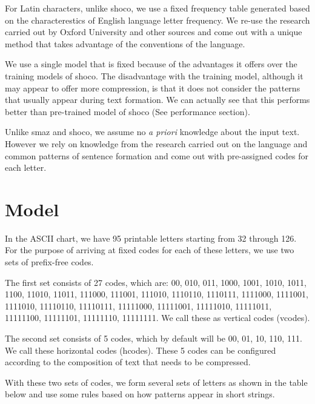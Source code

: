 \documentclass[]{article}
\begin{document}
For Latin characters, unlike shoco, we use a fixed frequency table generated based on the characterestics of English language letter frequency.  We re-use the research carried out by Oxford University \cite{7} and other sources \cite{7} \cite{9} and come out with a unique method that takes advantage of the conventions of the language.

We use a single model that is fixed because of the advantages it offers over the training models of shoco. The disadvantage with the training model, although it may appear to offer more compression, is that it does not consider the patterns that usually appear during text formation. We can actually see that this performs better than pre-trained model of shoco (See performance section).

Unlike smaz and shoco, we assume no \emph{a priori} knowledge about the input text.  However we rely on knowledge from the research carried out on the language and common patterns of sentence formation and come out with pre-assigned codes for each letter.

\section{Model}

In the ASCII chart, we have 95 printable letters starting from 32 through 126.  For the purpose of arriving at fixed codes for each of these letters, we use two sets of prefix-free codes.

The first set consists of 27 codes, which are: 00, 010, 011, 1000, 1001, 1010, 1011, 1100, 11010, 11011, 111000, 111001, 111010, 1110110, 1110111, 1111000, 1111001, 1111010, 11110110, 11110111, 11111000, 11111001, 11111010, 11111011, 11111100, 11111101, 11111110, 11111111.  We call these as vertical codes (vcodes).

The second set consists of 5 codes, which by default will be 00, 01, 10, 110, 111.  We call these horizontal codes (hcodes).  These 5 codes can be configured according to the composition of text that needs to be compressed.

With these two sets of codes, we form several sets of letters as shown in the table below and use some rules based on how patterns appear in short strings.
\end{document}
